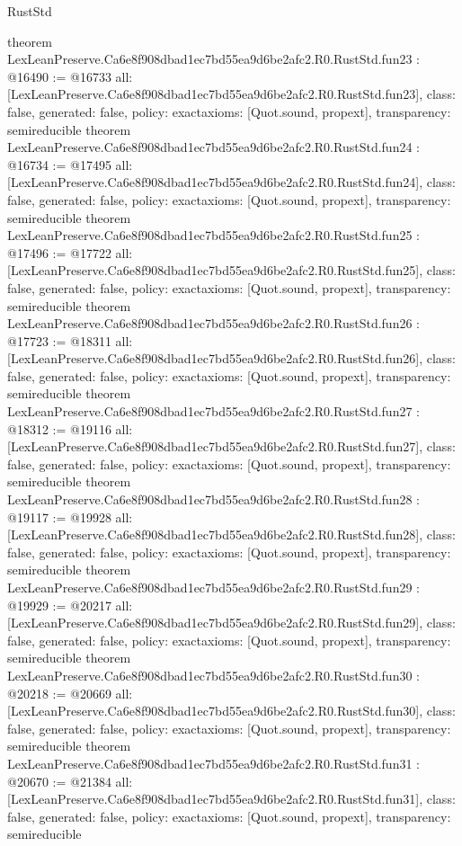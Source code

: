 \begin{lexlean}{RustStd}
\begin{coremodule}
{}
theorem LexLeanPreserve.Ca6e8f908dbad1ec7bd55ea9d6be2afc2.R0.RustStd.fun23 : @16490 := @16733 {
  all: [LexLeanPreserve.Ca6e8f908dbad1ec7bd55ea9d6be2afc2.R0.RustStd.fun23],
  class: false,
  generated: false,
  policy: exact{axioms: [Quot.sound, propext]},
  transparency: semireducible
}
theorem LexLeanPreserve.Ca6e8f908dbad1ec7bd55ea9d6be2afc2.R0.RustStd.fun24 : @16734 := @17495 {
  all: [LexLeanPreserve.Ca6e8f908dbad1ec7bd55ea9d6be2afc2.R0.RustStd.fun24],
  class: false,
  generated: false,
  policy: exact{axioms: [Quot.sound, propext]},
  transparency: semireducible
}
theorem LexLeanPreserve.Ca6e8f908dbad1ec7bd55ea9d6be2afc2.R0.RustStd.fun25 : @17496 := @17722 {
  all: [LexLeanPreserve.Ca6e8f908dbad1ec7bd55ea9d6be2afc2.R0.RustStd.fun25],
  class: false,
  generated: false,
  policy: exact{axioms: [Quot.sound, propext]},
  transparency: semireducible
}
theorem LexLeanPreserve.Ca6e8f908dbad1ec7bd55ea9d6be2afc2.R0.RustStd.fun26 : @17723 := @18311 {
  all: [LexLeanPreserve.Ca6e8f908dbad1ec7bd55ea9d6be2afc2.R0.RustStd.fun26],
  class: false,
  generated: false,
  policy: exact{axioms: [Quot.sound, propext]},
  transparency: semireducible
}
theorem LexLeanPreserve.Ca6e8f908dbad1ec7bd55ea9d6be2afc2.R0.RustStd.fun27 : @18312 := @19116 {
  all: [LexLeanPreserve.Ca6e8f908dbad1ec7bd55ea9d6be2afc2.R0.RustStd.fun27],
  class: false,
  generated: false,
  policy: exact{axioms: [Quot.sound, propext]},
  transparency: semireducible
}
theorem LexLeanPreserve.Ca6e8f908dbad1ec7bd55ea9d6be2afc2.R0.RustStd.fun28 : @19117 := @19928 {
  all: [LexLeanPreserve.Ca6e8f908dbad1ec7bd55ea9d6be2afc2.R0.RustStd.fun28],
  class: false,
  generated: false,
  policy: exact{axioms: [Quot.sound, propext]},
  transparency: semireducible
}
theorem LexLeanPreserve.Ca6e8f908dbad1ec7bd55ea9d6be2afc2.R0.RustStd.fun29 : @19929 := @20217 {
  all: [LexLeanPreserve.Ca6e8f908dbad1ec7bd55ea9d6be2afc2.R0.RustStd.fun29],
  class: false,
  generated: false,
  policy: exact{axioms: [Quot.sound, propext]},
  transparency: semireducible
}
theorem LexLeanPreserve.Ca6e8f908dbad1ec7bd55ea9d6be2afc2.R0.RustStd.fun30 : @20218 := @20669 {
  all: [LexLeanPreserve.Ca6e8f908dbad1ec7bd55ea9d6be2afc2.R0.RustStd.fun30],
  class: false,
  generated: false,
  policy: exact{axioms: [Quot.sound, propext]},
  transparency: semireducible
}
theorem LexLeanPreserve.Ca6e8f908dbad1ec7bd55ea9d6be2afc2.R0.RustStd.fun31 : @20670 := @21384 {
  all: [LexLeanPreserve.Ca6e8f908dbad1ec7bd55ea9d6be2afc2.R0.RustStd.fun31],
  class: false,
  generated: false,
  policy: exact{axioms: [Quot.sound, propext]},
  transparency: semireducible
}
\end{coremodule}
\end{lexlean}
